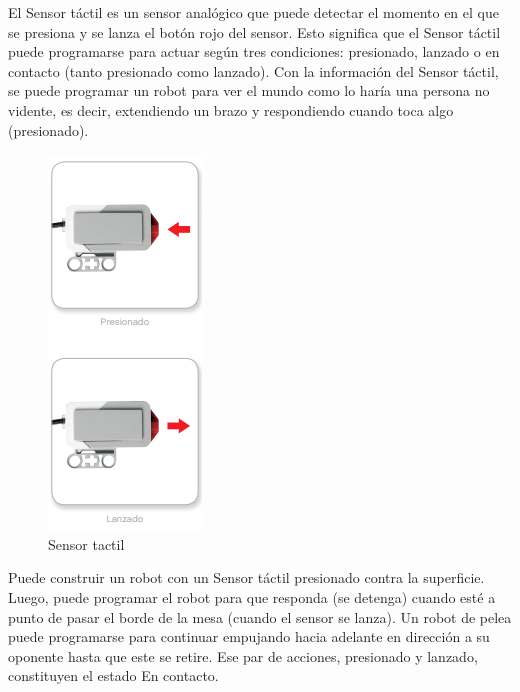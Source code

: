 El Sensor táctil es un sensor analógico que puede detectar el momento en el que se presiona y se lanza el botón rojo del sensor. Esto significa que el Sensor táctil puede programarse para actuar según tres condiciones: presionado, lanzado o en contacto (tanto presionado como lanzado). Con la información del Sensor táctil, se puede programar un robot para ver el mundo como lo haría una persona no vidente, es decir, extendiendo un brazo y respondiendo cuando toca algo (presionado).
\begin{figure}
    \centering
    \includegraphics[width=0.5\linewidth]{img/tactil.png}
    \caption{Sensor tactil}
    \label{fig:tactil}
\end{figure}
Puede construir un robot con un Sensor táctil presionado contra la superficie. Luego, puede programar el robot para que responda (se detenga) cuando esté a punto de pasar el borde de la mesa (cuando el sensor se lanza). Un robot de pelea puede programarse para continuar empujando hacia adelante en dirección a su oponente hasta que este se retire. Ese par de acciones, presionado y lanzado, constituyen el estado En contacto.

